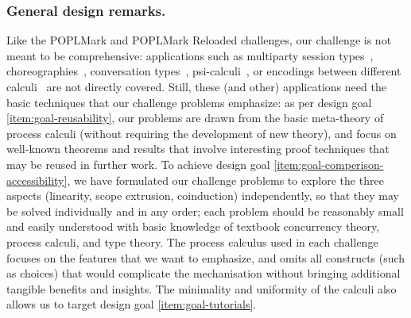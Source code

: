 \documentclass[runningheads]{llncs}
\begin{document}
\subsubsection{General design remarks.}
Like the POPLMark and POPLMark Reloaded challenges, our challenge is not meant to be comprehensive:
applications such as multiparty session types~\cite{10.1145/2827695,10.1145/3290343}, choreographies~\cite{DBLP:journals/jar/CruzFilipeMP23}, conversation types~\cite{DBLP:journals/tcs/CairesV10}, psi-calculi~\cite{lmcs:696}, or encodings between different calculi~\cite{DBLP:journals/iandc/Gorla10,DBLP:conf/forte/CairesP16,DBLP:journals/iandc/DardhaGS17,DBLP:conf/ecoop/ScalasDHY17,DBLP:journals/iandc/KouzapasPY19,10.1145/3479394.3479407} are not directly covered.  Still, these (and other) applications need the basic techniques that our challenge problems emphasize:
as per design goal \ref{item:goal-reusability},
our problems are drawn from the basic meta-theory of process calculi (without requiring the development of new theory), and focus on well-known theorems
and results that involve interesting proof techniques that may be reused in further work.
To achieve design goal \ref{item:goal-comperison-accessibility},
we have formulated our challenge problems to explore the three aspects (linearity, scope extrusion, coinduction) independently, so that they may be solved individually and in any order;
each problem should be reasonably small and easily understood with basic knowledge of textbook concurrency theory, process calculi, and type theory.  The process calculus used in each challenge
focuses on the features that we want to emphasize, and omits all constructs
(such as choices) that would complicate the mechanisation without bringing additional tangible
benefits and insights. 
The minimality and uniformity of the calculi also allows us to target design
goal \ref{item:goal-tutorials}.


\end{document}
